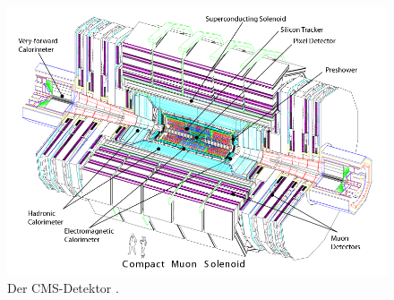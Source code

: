 	\begin{figure}[t]
		\centering
		\includegraphics[scale=0.50]{LHC/cms_complete}
		\caption[Der CMS-Detektor]{Der CMS-Detektor \cite{Chatrchyan:2008aa}.}
		\label{cmsdetektor}
	\end{figure}

